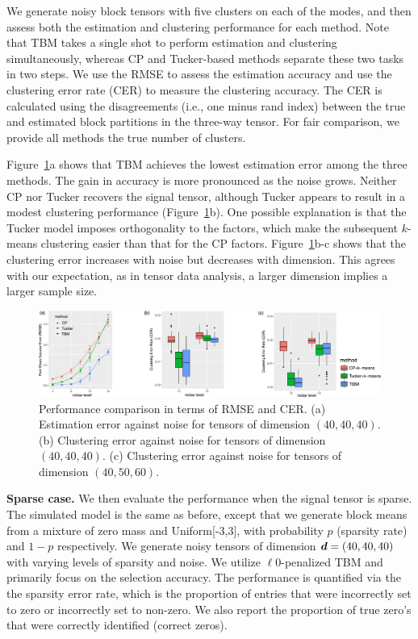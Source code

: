 \documentclass[11pt]{article}
\theoremstyle{plain}
\theoremstyle{definition}
\begin{document}
We generate noisy block tensors with five clusters on each of the modes, and then assess both the estimation and clustering performance for each method. Note that TBM takes a single shot to perform estimation and clustering simultaneously, whereas CP and Tucker-based methods separate these two tasks in two steps. We use the RMSE to assess the estimation accuracy and use the clustering error rate (CER) to measure the clustering accuracy. The CER is calculated using the disagreements (i.e., one minus rand index) between the true and estimated block partitions in the three-way tensor. For fair comparison, we provide all methods the true number of clusters. 

Figure~\ref{fig4}a shows that TBM achieves the lowest estimation error among the three methods. The gain in accuracy is more pronounced as the noise grows. Neither CP nor Tucker recovers the signal tensor, although Tucker appears to result in a modest clustering performance (Figure~\ref{fig4}b). One possible explanation is that the Tucker model imposes orthogonality to the factors, which make the subsequent $k$-means clustering easier than that for the CP factors. Figure~\ref{fig4}b-c shows that the clustering error increases with noise but decreases with dimension. This agrees with our expectation, as in tensor data analysis, a larger dimension implies a larger sample size. 



\begin{figure}[h!]
\centering
\includegraphics[width=.8\textwidth]{compare}
\caption{\small Performance comparison in terms of RMSE and CER. (a) Estimation error against noise for tensors of dimension $(40,40,40)$. (b) Clustering error against noise for tensors of dimension $(40,40,40)$. (c) Clustering error against noise for tensors of dimension $(40,50,60)$.} \label{fig4}

\end{figure}


\textbf{Sparse case.} We then evaluate the performance when the signal tensor is sparse. The simulated model is the same as before, except that we generate block means from a mixture of zero mass and Uniform[-3,3], with probability $p$ (sparsity rate) and $1-p$ respectively. We generate noisy tensors of dimension $\bm{d}=(40,40,40)$ with varying levels of sparsity and noise. We utilize $\ell0$-penalized TBM and primarily focus on the selection accuracy. 
The performance is quantified via the the sparsity error rate, which is the proportion of entries that were incorrectly set to zero or incorrectly set to non-zero. We also report the proportion of true zero's that were correctly identified (correct zeros). 
\end{document}

